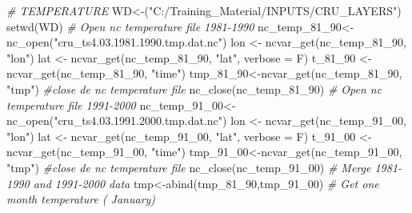 \documentclass[
  10pt,
  b5paper,
]{book}
\newenvironment{Shaded}{\begin{snugshade}}{\end{snugshade}}
\newcommand{\AttributeTok}[1]{\textcolor[rgb]{0.77,0.63,0.00}{#1}}
\newcommand{\CommentTok}[1]{\textcolor[rgb]{0.56,0.35,0.01}{\textit{#1}}}
\newcommand{\FunctionTok}[1]{\textcolor[rgb]{0.00,0.00,0.00}{#1}}
\newcommand{\NormalTok}[1]{#1}
\newcommand{\OtherTok}[1]{\textcolor[rgb]{0.56,0.35,0.01}{#1}}
\newcommand{\StringTok}[1]{\textcolor[rgb]{0.31,0.60,0.02}{#1}}
\begin{document}
\begin{Shaded}
\begin{Highlighting}[]
\CommentTok{\# TEMPERATURE}
\NormalTok{WD}\OtherTok{\textless{}{-}}\NormalTok{(}\StringTok{"C:/Training\_Material/INPUTS/CRU\_LAYERS"}\NormalTok{)}
\FunctionTok{setwd}\NormalTok{(WD)}
 \CommentTok{\# Open nc temperature file 1981{-}1990}
\NormalTok{nc\_temp\_81\_90}\OtherTok{\textless{}{-}}\FunctionTok{nc\_open}\NormalTok{(}\StringTok{"cru\_ts4.03.1981.1990.tmp.dat.nc"}\NormalTok{)}
\NormalTok{ lon }\OtherTok{\textless{}{-}} \FunctionTok{ncvar\_get}\NormalTok{(nc\_temp\_81\_90, }\StringTok{"lon"}\NormalTok{)}
\NormalTok{lat }\OtherTok{\textless{}{-}} \FunctionTok{ncvar\_get}\NormalTok{(nc\_temp\_81\_90, }\StringTok{"lat"}\NormalTok{, }\AttributeTok{verbose =}\NormalTok{ F)}
\NormalTok{t\_81\_90 }\OtherTok{\textless{}{-}} \FunctionTok{ncvar\_get}\NormalTok{(nc\_temp\_81\_90, }\StringTok{"time"}\NormalTok{)}
\NormalTok{ tmp\_81\_90}\OtherTok{\textless{}{-}}\FunctionTok{ncvar\_get}\NormalTok{(nc\_temp\_81\_90, }\StringTok{"tmp"}\NormalTok{)}
 \CommentTok{\#close de nc temperature file}
 \FunctionTok{nc\_close}\NormalTok{(nc\_temp\_81\_90) }
 \CommentTok{\# Open nc temperature file 1991{-}2000}
\NormalTok{nc\_temp\_91\_00}\OtherTok{\textless{}{-}}\FunctionTok{nc\_open}\NormalTok{(}\StringTok{"cru\_ts4.03.1991.2000.tmp.dat.nc"}\NormalTok{)}
\NormalTok{ lon }\OtherTok{\textless{}{-}} \FunctionTok{ncvar\_get}\NormalTok{(nc\_temp\_91\_00, }\StringTok{"lon"}\NormalTok{)}
\NormalTok{lat }\OtherTok{\textless{}{-}} \FunctionTok{ncvar\_get}\NormalTok{(nc\_temp\_91\_00, }\StringTok{"lat"}\NormalTok{, }\AttributeTok{verbose =}\NormalTok{ F)}
\NormalTok{t\_91\_00 }\OtherTok{\textless{}{-}} \FunctionTok{ncvar\_get}\NormalTok{(nc\_temp\_91\_00, }\StringTok{"time"}\NormalTok{)}
\NormalTok{ tmp\_91\_00}\OtherTok{\textless{}{-}}\FunctionTok{ncvar\_get}\NormalTok{(nc\_temp\_91\_00, }\StringTok{"tmp"}\NormalTok{)}
 \CommentTok{\#close de nc temperature file}
 \FunctionTok{nc\_close}\NormalTok{(nc\_temp\_91\_00) }
 \CommentTok{\# Merge 1981{-}1990 and 1991{-}2000 data }
\NormalTok{ tmp}\OtherTok{\textless{}{-}}\FunctionTok{abind}\NormalTok{(tmp\_81\_90,tmp\_91\_00)}
 \CommentTok{\# Get one month temperature ( January)}
 

\end{Highlighting}
\end{Shaded}
\end{document}
